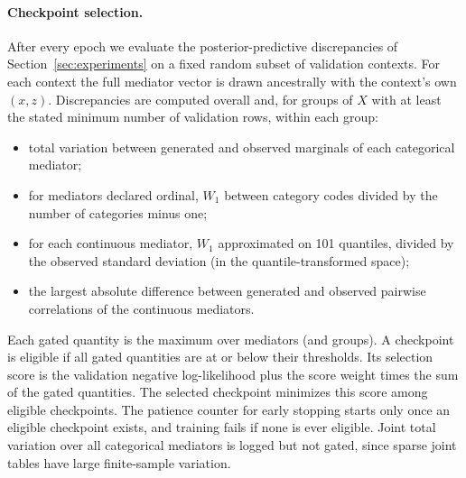 \paragraph{Checkpoint selection.}
After every epoch we evaluate the posterior-predictive discrepancies of
Section~\ref{sec:experiments} on a fixed random subset of validation contexts.
For each context the full mediator vector is drawn ancestrally with the
context's own $(x,z)$. Discrepancies are computed overall and, for groups of
$X$ with at least the stated minimum number of validation rows, within each
group:
\begin{itemize}[nosep]
  \item total variation between generated and observed marginals of each
        categorical mediator;
  \item for mediators declared ordinal, $W_1$ between category codes divided
        by the number of categories minus one;
  \item for each continuous mediator, $W_1$ approximated on 101 quantiles,
        divided by the observed standard deviation (in the quantile-transformed
        space);
  \item the largest absolute difference between generated and observed
        pairwise correlations of the continuous mediators.
\end{itemize}
Each gated quantity is the maximum over mediators (and groups). A checkpoint
is eligible if all gated quantities are at or below their thresholds. Its
selection score is the validation negative log-likelihood plus the
score weight times the sum of the gated quantities. The selected checkpoint
minimizes this score among eligible checkpoints. The patience counter for
early stopping starts only once an eligible checkpoint exists, and training
fails if none is ever eligible. Joint total variation over all categorical
mediators is logged but not gated, since sparse joint tables have large
finite-sample variation.

